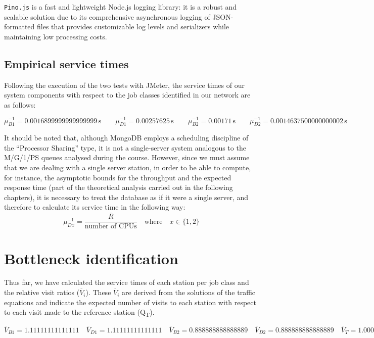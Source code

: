 \verb|Pino.js| is a fast and lightweight Node.js logging library: it is a robust and scalable solution due to its comprehensive asynchronous logging of JSON-formatted files that provides customizable log levels and serializers while maintaining low processing costs.

\subsection{Empirical service times}

Following the execution of the two tests with JMeter, the service times of our system components with respect to the job classes identified in our network are as follows:

\[
\mu^{-1}_{B1} = \num[round-mode=places, round-precision=5]{0.0016899999999999999} \, \text{s}
\quad \quad
\mu^{-1}_{D1} = \num[round-mode=places, round-precision=5]{0.00257625} \, \text{s}
\quad \quad
\mu^{-1}_{B2} = \num[round-mode=places, round-precision=5]{0.00171} \, \text{s}
\quad \quad
\mu^{-1}_{D2} = \num[round-mode=places, round-precision=5]{0.0014637500000000002} \, \text{s}
\]

It should be noted that, although MongoDB employs a scheduling discipline of the ``Processor Sharing'' type, it is not a single-server system analogous to the M/G/1/PS queues analysed during the course.
However, since we must assume that we are dealing with a single server station, in order to be able to compute, for instance, the asymptotic bounds for the throughput and the expected response time (part of the theoretical analysis carried out in the following chapters), it is necessary to treat the database as if it were a single server, and therefore to calculate its service time in the following way:
\[
	\mu^{-1}_{Dx} = \frac{\overline{R}}{\text{number of CPUs}} \quad \text{where} \quad x \in \{1, 2\}
\]

\section{Bottleneck identification}

Thus far, we have calculated the service times of each station per job class and the relative visit ratios ($\overline{V}_{i}$).
These $\overline{V}_{i}$ are derived from the solutions of the traffic equations and indicate the expected number of visits to each station with respect to each visit made to the reference station (Q\textsubscript{T}).

\[
\overline{V}_{B1} = \num[round-mode=places, round-precision=5]{1.11111111111111}
\quad
\overline{V}_{D1} = \num[round-mode=places, round-precision=5]{1.11111111111111}
\quad
\overline{V}_{B2} = \num[round-mode=places, round-precision=5]{0.888888888888889}
\quad
\overline{V}_{D2} = \num[round-mode=places, round-precision=5]{0.888888888888889}
\quad
\overline{V}_{T} = \num[round-mode=places, round-precision=5]{1.00000000000000}
\]

